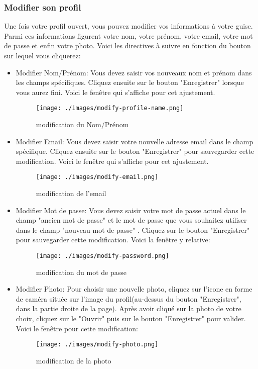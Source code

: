 \documentclass[12pt]{article}
\begin{document}
\subsubsection{Modifier son profil}
Une fois votre profil ouvert, vous pouvez modifier vos informations à votre guise. Parmi ces informations figurent votre nom, votre prénom, votre email, votre mot de passe et enfin votre photo. Voici les directives à suivre en fonction du bouton sur lequel vous cliquerez:
\medskip
\begin{itemize}
\item Modifier Nom/Prénom: Vous devez saisir vos nouveaux nom et prénom dans les champs spécifiques. Cliquez ensuite sur le bouton "Enregistrer" lorsque vous aurez fini. Voici le fenêtre qui s'affiche pour cet ajustement.
    \begin{figure}[h!]
        \centering
        \texttt{[image: ./images/modify-profile-name.png]}
        \caption{modification du Nom/Prénom}
        \label{fig:modification du Nom/Prénom}
    \end{figure}
    
\item Modifier Email: Vous devez saisir votre nouvelle adresse email dans le champ spécifique. Cliquez ensuite sur le bouton "Enregistrer" pour sauvegarder cette modification. Voici le fenêtre qui s'affiche pour cet ajustement.
    \begin{figure}[h!]
        \centering
        \texttt{[image: ./images/modify-email.png]}
        \caption{modification de l'email}
        \label{fig:modification de l'email}
    \end{figure}
\item Modifier Mot de passe: Vous devez saisir votre mot de passe actuel dans le champ  "ancien mot de passe"  et le mot de passe que vous souhaitez utiliser dans le champ  "nouveau mot de passe" . Cliquez sur le bouton "Enregistrer" pour sauvegarder cette modification. Voici la fenêtre y relative:
    \begin{figure}[h!]
        \centering
        \texttt{[image: ./images/modify-password.png]}
        \caption{modification du mot de passe}
        \label{fig:modification du mot de passe}
    \end{figure}
\item Modifier Photo: Pour choisir une nouvelle photo, cliquez sur l'icone en forme de caméra située sur l'image du profil(au-dessus du bouton "Enregistrer", dans la partie droite de la page). Après avoir cliqué sur la photo de votre choix, cliquez sur le "Ouvrir" puis sur le bouton "Enregistrer" pour valider. Voici le fenêtre pour cette modification:
    \begin{figure}[h!]
        \centering
        \texttt{[image: ./images/modify-photo.png]}
        \caption{modification de la photo}
        \label{fig:modification de la photo}
    \end{figure}
\end{itemize}
\end{document}
